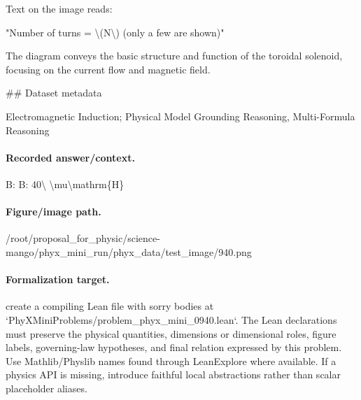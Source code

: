 Text on the image reads:

"Number of turns = \textbackslash{}(N\textbackslash{}) (only a few are shown)"

The diagram conveys the basic structure and function of the toroidal solenoid, focusing on the current flow and magnetic field.

\#\# Dataset metadata

Electromagnetic Induction; Physical Model Grounding Reasoning, Multi-Formula Reasoning

\paragraph{Recorded answer/context.}
B: B: 40\textbackslash{} \textbackslash{}mu\textbackslash{}mathrm\{H\}

\paragraph{Figure/image path.}
/root/proposal\_for\_physic/science-mango/phyx\_mini\_run/phyx\_data/test\_image/940.png

\paragraph{Formalization target.}
create a compiling Lean file with sorry bodies at `PhyXMiniProblems/problem\_phyx\_mini\_0940.lean`. The Lean declarations must preserve the physical quantities, dimensions or dimensional roles, figure labels, governing-law hypotheses, and final relation expressed by this problem.
Use Mathlib/Physlib names found through LeanExplore where available. If a physics API is missing, introduce faithful local abstractions rather than scalar placeholder aliases.

